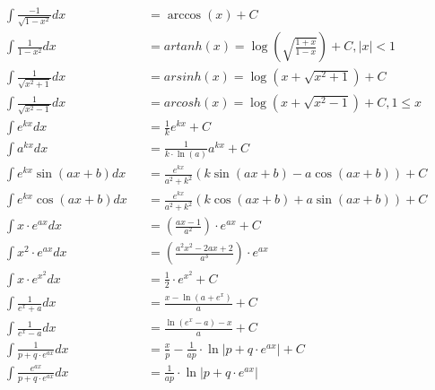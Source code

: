 \begin{footnotesize}
\begin{align*}
         & \int \frac{-1}{\sqrt{1-x^2}}dx        &  & =\arccos(x)+C                                                                     \\
         & \int \frac{1}{1-x^2}dx                &  & =artanh(x)=\log(\sqrt{\frac{1+x}{1-x}})+C, \vert x \vert < 1                      \\
         & \int \frac{1}{\sqrt{x^2+1}}dx         &  & =arsinh(x)=\log(x+\sqrt{x^2+1})+C                                                 \\
         & \int \frac{1}{\sqrt{x^2-1}}dx         &  & =arcosh(x)=\log(x+\sqrt{x^2-1})+C, 1 \leq x                                       \\
         & \int e^{kx}dx                         &  & =\frac{1}{k}e^{kx}+C                                                              \\
         & \int a^{kx}dx                         &  & =\frac{1}{k\cdot \ln(a)}a^{kx}+C                                                  \\
         & \int e^{kx}\sin(ax+b)dx               &  & =\frac{e^{kx}}{a^2+k^2}\left(k\sin(ax+b)-a\cos(ax+b)\right)+C                     \\
         & \int e^{kx}\cos(ax+b)dx               &  & =\frac{e^{kx}}{a^2+k^2}\left(k\cos(ax+b)+a\sin(ax+b)\right)+C                     \\
         & \int x \cdot e^{ax}dx                 &  & =(\frac{ax-1}{a^2})\cdot e^{ax}+C                                                 \\
         & \int x^2 \cdot e^{ax}dx               &  & =(\frac{a^2x^2-2ax+2}{a^3})\cdot e^{ax}                                           \\
         & \int x\cdot e^{x^2}dx                 &  & =\frac{1}{2}\cdot e^{x^2}+C                                                       \\
         & \int \frac{1}{e^x+a}dx                &  & =\frac{x-\ln(a+e^x)}{a}+C                                                         \\
         & \int \frac{1}{e^x-a}dx                &  & =\frac{\ln(e^x-a)-x}{a}+C                                                         \\
         & \int \frac{1}{p+q\cdot e^{ax}}dx      &  & =\frac{x}{p}-\frac{1}{ap}\cdot \ln\vert p+q\cdot e^{ax}\vert+C                    \\
         & \int \frac{e^{ax}}{p+q\cdot e^{ax}}dx &  & =\frac{1}{ap}\cdot \ln\vert p+q\cdot e^{ax}\vert                                  \\

\end{align*}
\end{footnotesize}
